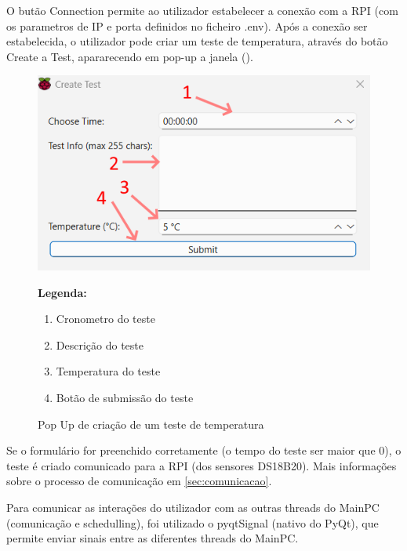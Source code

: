 O butão Connection permite ao utilizador estabelecer a conexão com a RPI (com os parametros de IP e porta definidos no ficheiro .env).
Após a conexão ser estabelecida, o utilizador pode criar um teste de temperatura, através do botão Create a Test, apararecendo
em pop-up a janela ().

\begin{figure}[H]
    \centering
    \begin{minipage}{0.6\textwidth}
        \includegraphics[width=\linewidth]{figures/gui_2.png}
    \end{minipage}%
    \hfill
    \begin{minipage}{0.35\textwidth}
        \small
        \textbf{Legenda:}
        \begin{enumerate}
            \item Cronometro do teste
            \item Descrição do teste
            \item Temperatura do teste
            \item Botão de submissão do teste
        \end{enumerate}
    \end{minipage}
    \caption{Pop Up de criação de um teste de temperatura}
    \label{fig:gui_2}
\end{figure}

Se o formulário for preenchido corretamente (o tempo do teste ser maior que 0), o teste é criado 
comunicado para a RPI (dos sensores DS18B20). Mais informações sobre o processo de comunicação
em \autoref{sec:comunicacao}.

Para comunicar as interações do utilizador com as outras threads do MainPC (comunicação e schedulling), foi utilizado
o pyqtSignal (nativo do PyQt), que permite enviar sinais entre as diferentes threads do MainPC.

